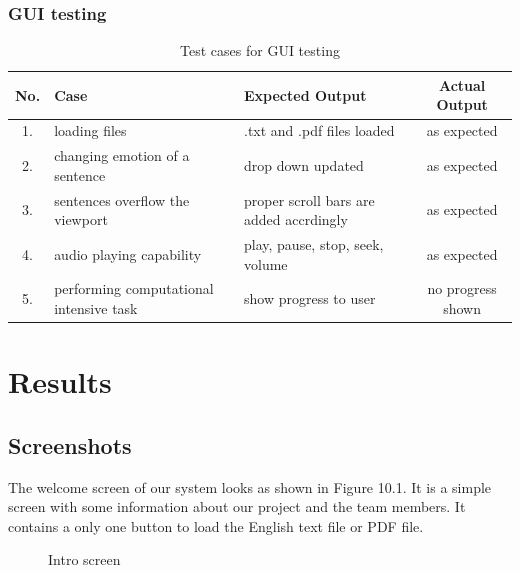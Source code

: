 \documentclass[oneside,a4paper,12pt]{book}
\begin{document}
\subsection{GUI testing}
\begin{table}[!htbp]
	\def\arraystretch{1.5}
	\begin{tabularx}{\textwidth}{|c|X|X|c|}
		\hline 
		No. & Case	& Expected Output & Actual Output \\ \hline
		1. & loading files & .txt and .pdf files loaded & as expected \\ \hline
		2. & changing emotion of a sentence & drop down updated & as expected \\ \hline
		3. & sentences overflow the viewport & proper scroll bars are added accrdingly & as expected \\ \hline
		4. & audio playing capability & play, pause, stop, seek, volume & as expected \\ \hline
		5. & performing computational intensive task & show progress to user & no progress shown \\ \hline
	\end{tabularx}
	\caption{Test cases for GUI testing}
	\label{tab:testcases}
\end{table}

\chapter{Results}
\section{Screenshots}
The welcome screen of our system looks as shown in Figure 10.1. It is a simple screen with some information about our project and the team members. It contains a only one button to load the English text file or PDF file.
 \begin{center}
 	\begin{figure}[!htbp]
 		\centering
 		\caption{Intro screen}
 		\label{fig:intro-screen}
 	\end{figure}
 \end{center} 
\end{document}
